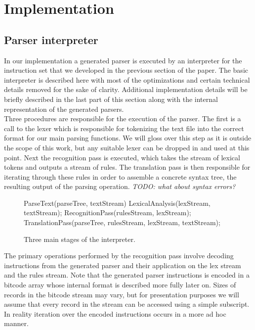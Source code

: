 \documentclass[11pt]{article}
\begin{document}
\section{Implementation}
\subsection{Parser interpreter}

In our implementation a generated parser is executed by an interpreter for the instruction set that we developed in the previous section of the paper.
The basic interpreter is described here with most of the optimizations and certain technical details removed for the sake of clarity. 
Additional implementation details will be briefly described in the last part of this section along with the internal representation of the generated parsers.\\

Three procedures are responsible for the execution of the parser. 
The first is a call to the lexer which is responsible for tokenizing the text file into the correct format for our main parsing functions.
We will gloss over this step as it is outside the scope of this work, but any suitable lexer can be dropped in and used at this point.
Next the recognition pass is executed, which takes the stream of lexical tokens and outputs a stream of rules. 
The translation pass is then responsible for iterating through these rules in order to assemble a concrete syntax tree, the resulting output of the parsing operation.
\emph{TODO: what about syntax errors?}

\begin{figure}[!ht]
\begin{center}
\begin{gcl}
\PROC ParseText(parseTree, textStream)
LexicalAnalysis(lexStream, textStream);
RecognitionPass(rulesStream, lexStream);
TranslationPass(parseTree, rulesStream, lexStream, textStream);
\CORP
\end{gcl}
\caption{Three main stages of the interpreter.}
\end{center}
\end{figure}

The primary operations performed by the recognition pass involve decoding instructions from the generated parser and their application on the lex stream and the rules stream. 
Note that the generated parser instructions is encoded in a bitcode array whose internal format is described more fully later on.
Sizes of records in the bitcode stream may vary, but for presentation purposes we will assume that every record in the stream can be accessed using a simple subscript.
In reality iteration over the encoded instructions occurs in a more ad hoc manner.
\end{document}
